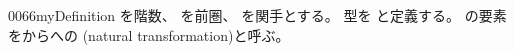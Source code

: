 \documentclass[index]{subfiles}
\begin{document}
\begin{myBlock}{0066}{myDefinition}
  を階数、
  を前圏、
  を関手とする。
  型を
  と定義する。
  の要素をからへの
  (natural transformation)と呼ぶ。
\end{myBlock}
\end{document}
